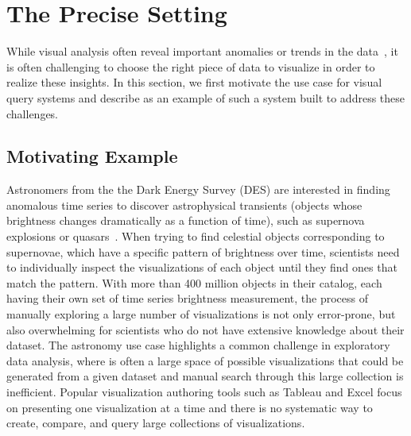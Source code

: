 
\section{The Precise Setting}\label{sec:precise}
While visual analysis often reveal important anomalies or trends in the data~\cite{Heer2012,Morton2014}, it is often challenging to choose the right piece of data to visualize in order to realize these insights. In this section, we first motivate the use case for visual query systems and describe \zv as an example of such a system built to address these challenges.
\subsection{Motivating Example}
Astronomers from the the Dark Energy Survey (DES) are interested in finding anomalous time series to discover astrophysical transients (objects whose brightness changes dramatically as a function of time), such as supernova explosions or quasars~\cite{Drlica-Wagner2017}. When trying to find celestial objects corresponding to supernovae, which have a specific pattern of brightness over time, scientists need to individually inspect the visualizations of each object until they find ones that match the pattern. With more than 400 million objects in their catalog, each having their own set of time series brightness measurement, the process of manually exploring a large number of visualizations is not only error-prone, but also overwhelming for scientists who do not have extensive knowledge about their dataset. The astronomy use case highlights a common challenge in exploratory data analysis, where is often a large space of possible visualizations that could be generated from a given dataset and manual search through this large collection is inefficient. Popular visualization authoring tools such as Tableau and Excel focus on presenting one visualization at a time and there is no systematic way to create, compare, and query large collections of visualizations. 

